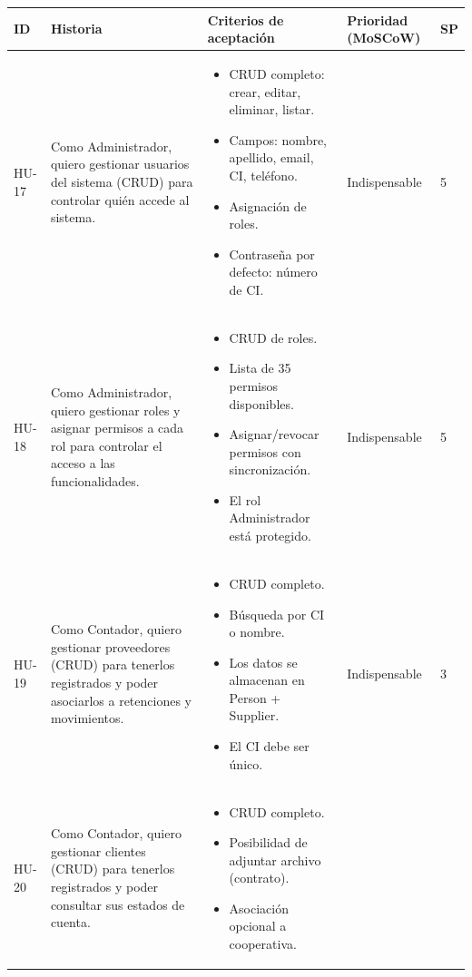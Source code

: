 \documentclass[stu]{apa7}
\begin{document}
\begin{longtable}{|L{0.8cm}|L{4.5cm}|L{3.5cm}|L{2cm}|L{1.5cm}|}
\hline
{}
\textbf{ID} & \textbf{Historia} & \textbf{Criterios de aceptación} & \textbf{Prioridad (MoSCoW)} & \textbf{SP} \\
\hline
\endhead
HU-17 & Como Administrador, quiero gestionar usuarios del sistema (CRUD) para controlar quién accede al sistema. & 
\begin{itemize}[nosep]
    \item CRUD completo: crear, editar, eliminar, listar.
    \item Campos: nombre, apellido, email, CI, teléfono.
    \item Asignación de roles.
    \item Contraseña por defecto: número de CI.
\end{itemize} & Indispensable & 5 \\
\hline
HU-18 & Como Administrador, quiero gestionar roles y asignar permisos a cada rol para controlar el acceso a las funcionalidades. & 
\begin{itemize}[nosep]
    \item CRUD de roles.
    \item Lista de 35 permisos disponibles.
    \item Asignar/revocar permisos con sincronización.
    \item El rol Administrador está protegido.
\end{itemize} & Indispensable & 5 \\
\hline
HU-19 & Como Contador, quiero gestionar proveedores (CRUD) para tenerlos registrados y poder asociarlos a retenciones y movimientos. & 
\begin{itemize}[nosep]
    \item CRUD completo.
    \item Búsqueda por CI o nombre.
    \item Los datos se almacenan en Person + Supplier.
    \item El CI debe ser único.
\end{itemize} & Indispensable & 3 \\
\hline
HU-20 & Como Contador, quiero gestionar clientes (CRUD) para tenerlos registrados y poder consultar sus estados de cuenta. & 
\begin{itemize}[nosep]
    \item CRUD completo.
    \item Posibilidad de adjuntar archivo (contrato).
    \item Asociación opcional a cooperativa.

\end{itemize}
\end{longtable}
\end{document}

